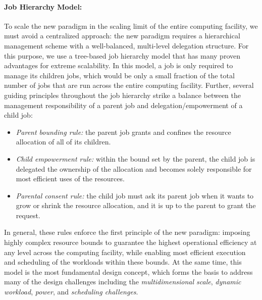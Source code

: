 \documentclass[10pt]{article}
\begin{document}
\paragraph{Job Hierarchy Model:}
To scale the new paradigm in the scaling limit of the entire computing facility,
we must avoid a centralized approach: the new paradigm requires a hierarchical management scheme 
with a well-balanced, multi-level delegation structure. 
For this purpose, we use a tree-based job hierarchy model that has many proven advantages
for extreme scalability. 
In this model, a job is only required to manage its children jobs,
which would be only a small fraction of the total number of jobs that are run
across the entire computing facility. Further, several guiding principles
throughout the job hierarchy strike a balance between the management
responsibility of a parent job and delegation/empowerment of a child job:
\begin{itemize}
\item{\sl Parent bounding rule:} the parent job grants and confines
     the resource allocation of all of its children.
\item{\sl Child empowerment rule:} within the bound set by the parent,
     the child job is delegated the ownership of the allocation
     and becomes solely responsible for most efficient uses of the resources.
\item{\sl Parental consent rule:} the child job must ask its parent job
     when it wants to grow or shrink the resource allocation, 
     and it is up to the parent to grant the request.                   
\end{itemize}
In general, these rules enforce the first principle of the new paradigm: 
imposing highly complex resource bounds to guarantee the highest operational efficiency
at any level across the computing facility, while enabling most efficient execution
and scheduling of the workloads within these bounds.
At the same time, this model is the most fundamental design concept,
which forms the basis to address many of the design challenges including 
the {\sl multidimensional scale}, {\sl dynamic workload}, {\sl power}, and
{\sl scheduling challenges}. 
\end{document}
